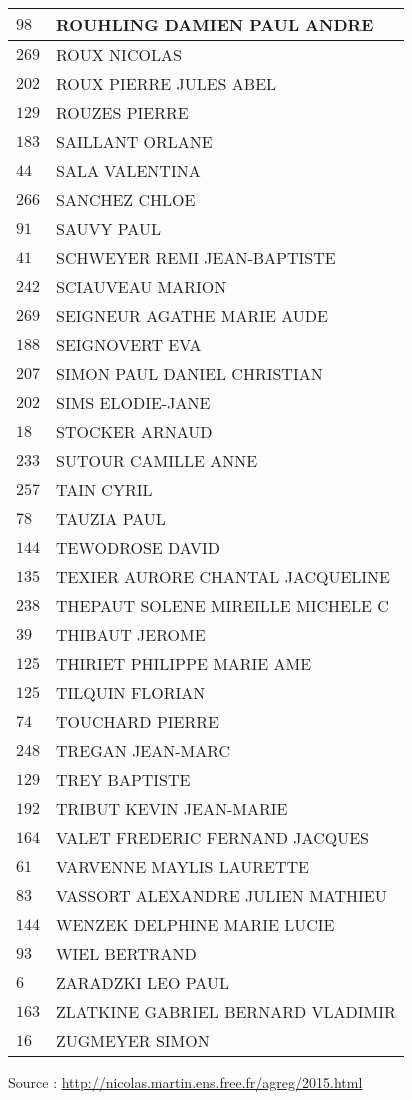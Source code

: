 \begin{xltabular}{\linewidth}{|l|X|}
    \hline
    $98$ & ROUHLING DAMIEN PAUL ANDRE \\
    \hline
    $269$ & ROUX NICOLAS \\
    \hline
    $202$ & ROUX PIERRE JULES ABEL \\
    \hline
    $129$ & ROUZES PIERRE \\
    \hline
    $183$ & SAILLANT ORLANE \\
    \hline
    $44$ & SALA VALENTINA \\
    \hline
    $266$ & SANCHEZ CHLOE \\
    \hline
    $91$ & SAUVY PAUL \\
    \hline
    $41$ & SCHWEYER REMI JEAN-BAPTISTE \\
    \hline
    $242$ & SCIAUVEAU MARION \\
    \hline
    $269$ & SEIGNEUR AGATHE MARIE AUDE \\
    \hline
    $188$ & SEIGNOVERT EVA \\
    \hline
    $207$ & SIMON PAUL DANIEL CHRISTIAN \\
    \hline
    $202$ & SIMS ELODIE-JANE \\
    \hline
    $18$ & STOCKER ARNAUD \\
    \hline
    $233$ & SUTOUR CAMILLE ANNE \\
    \hline
    $257$ & TAIN CYRIL \\
    \hline
    $78$ & TAUZIA PAUL \\
    \hline
    $144$ & TEWODROSE DAVID \\
    \hline
    $135$ & TEXIER AURORE CHANTAL JACQUELINE \\
    \hline
    $238$ & THEPAUT SOLENE MIREILLE MICHELE C \\
    \hline
    $39$ & THIBAUT JEROME \\
    \hline
    $125$ & THIRIET PHILIPPE MARIE AME \\
    \hline
    $125$ & TILQUIN FLORIAN \\
    \hline
    $74$ & TOUCHARD PIERRE \\
    \hline
    $248$ & TREGAN JEAN-MARC \\
    \hline
    $129$ & TREY BAPTISTE \\
    \hline
    $192$ & TRIBUT KEVIN JEAN-MARIE \\
    \hline
    $164$ & VALET FREDERIC FERNAND JACQUES \\
    \hline
    $61$ & VARVENNE MAYLIS LAURETTE \\
    \hline
    $83$ & VASSORT ALEXANDRE JULIEN MATHIEU \\
    \hline
    $144$ & WENZEK DELPHINE MARIE LUCIE \\
    \hline
    $93$ & WIEL BERTRAND \\
    \hline
    $6$ & ZARADZKI LEO PAUL \\
    \hline
    $163$ & ZLATKINE GABRIEL BERNARD VLADIMIR \\
    \hline
    $16$ & ZUGMEYER SIMON \\
    \hline
  \end{xltabular}

  \begin{flushright}
    {\tiny Source : \url{http://nicolas.martin.ens.free.fr/agreg/2015.html}}
  \end{flushright}

